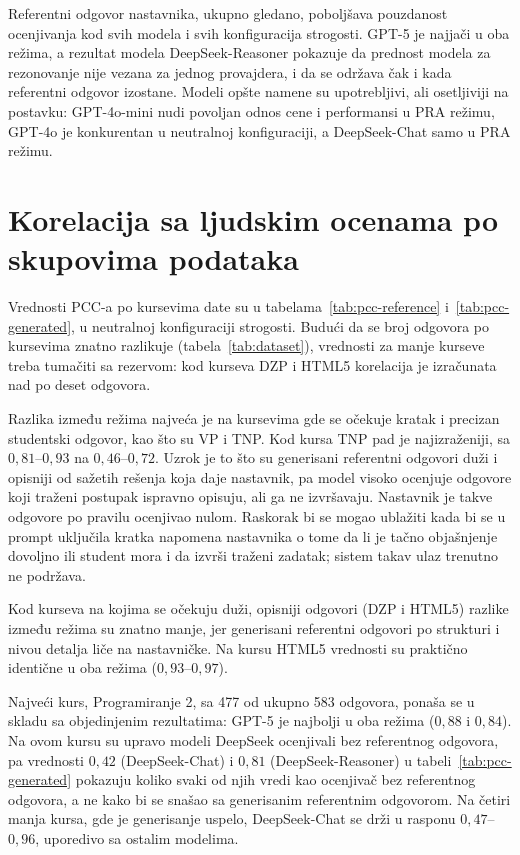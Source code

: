 Referentni odgovor nastavnika, ukupno gledano, poboljšava pouzdanost ocenjivanja kod svih modela i svih konfiguracija strogosti.
GPT-5 je najjači u oba režima,
a rezultat modela DeepSeek-Reasoner pokazuje da prednost modela za rezonovanje nije vezana za jednog provajdera,
i da se održava čak i kada referentni odgovor izostane.
Modeli opšte namene su upotrebljivi, ali osetljiviji na postavku: GPT-4o-mini nudi povoljan odnos cene i performansi u PRA režimu,
GPT-4o je konkurentan u neutralnoj konfiguraciji, a DeepSeek-Chat samo u PRA režimu.

\section{Korelacija sa ljudskim ocenama po skupovima podataka}
\label{sec:cross-dataset}

Vrednosti PCC-a po kursevima date su u tabelama~\ref{tab:pcc-reference} i~\ref{tab:pcc-generated}, u neutralnoj konfiguraciji strogosti.
Budući da se broj odgovora po kursevima znatno razlikuje (tabela~\ref{tab:dataset}),
vrednosti za manje kurseve treba tumačiti sa rezervom: kod kurseva DZP i HTML5 korelacija je izračunata nad po deset odgovora.

Razlika između režima najveća je na kursevima gde se očekuje kratak i precizan studentski odgovor, kao što su VP i TNP.
Kod kursa TNP pad je najizraženiji, sa $0{,}81$--$0{,}93$ na $0{,}46$--$0{,}72$.
Uzrok je to što su generisani referentni odgovori duži i opisniji od sažetih rešenja koja daje nastavnik,
pa model visoko ocenjuje odgovore koji traženi postupak ispravno opisuju, ali ga ne izvršavaju.
Nastavnik je takve odgovore po pravilu ocenjivao nulom.
Raskorak bi se mogao ublažiti kada bi se u prompt uključila kratka napomena nastavnika o tome
da li je tačno objašnjenje dovoljno ili student mora i da izvrši traženi zadatak;
sistem takav ulaz trenutno ne podržava.

Kod kurseva na kojima se očekuju duži, opisniji odgovori (DZP i HTML5) razlike između režima su znatno manje,
jer generisani referentni odgovori po strukturi i nivou detalja liče na nastavničke.
Na kursu HTML5 vrednosti su praktično identične u oba režima ($0{,}93$--$0{,}97$).

Najveći kurs, Programiranje 2, sa 477 od ukupno 583 odgovora,
ponaša se u skladu sa objedinjenim rezultatima: GPT-5 je najbolji u oba režima ($0{,}88$ i $0{,}84$).
Na ovom kursu su upravo modeli DeepSeek ocenjivali bez referentnog odgovora,
pa vrednosti $0{,}42$ (DeepSeek-Chat) i $0{,}81$ (DeepSeek-Reasoner) u tabeli~\ref{tab:pcc-generated}
pokazuju koliko svaki od njih vredi kao ocenjivač bez referentnog odgovora,
a ne kako bi se snašao sa generisanim referentnim odgovorom.
Na četiri manja kursa, gde je generisanje uspelo, DeepSeek-Chat se drži u rasponu $0{,}47$--$0{,}96$, uporedivo sa ostalim modelima.

